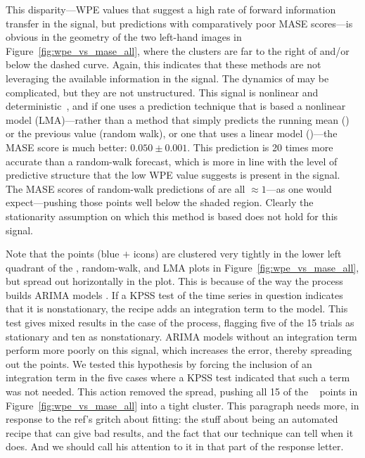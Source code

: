 This disparity---WPE values that suggest a high rate of forward
information transfer in the signal, but predictions with comparatively
poor MASE scores---is obvious in the geometry of the two left-hand
images in Figure~\ref{fig:wpe_vs_mase_all}, where the \col clusters
are far to the right of and/or below the dashed curve.  Again, this
indicates that these methods are not leveraging the available
information in the signal.  The dynamics of \col may be complicated,
but they are not unstructured.  This signal is nonlinear and
deterministic~\cite{mytkowicz09}, and if one uses a prediction
technique that is based a nonlinear model (LMA)---rather than a method
that simply predicts the running mean (\naive) or the previous value
(random walk), or one that uses a linear model (\arima)---the MASE
score is much better: $0.050 \pm 0.001$.  This prediction is 20 times
more accurate than a random-walk forecast, which is more in line with
the level of predictive structure that the low WPE value suggests is
present in the signal.  The MASE scores of random-walk predictions of
\col are all $\approx 1$---as one would expect---pushing those points
well below the shaded region.  Clearly the stationarity assumption on
which this method is based does not hold for this signal.

Note that the \col points (blue {\color{blue}$+$} icons) are clustered
very tightly in the lower left quadrant of the \naive, random-walk,
and LMA plots in Figure~\ref{fig:wpe_vs_mase_all}, but spread out
horizontally in the \arima plot.  This is because of the way the
\arima process builds ARIMA models \cite{autoARIMA}.  If a KPSS test
of the time series in question indicates that it is nonstationary, the
\arima recipe adds an integration term to the model.  This test gives
mixed results in the case of the \col process, flagging five of the 15
trials as stationary and ten as nonstationary.  ARIMA models without
an integration term perform more poorly on this signal, which
increases the error, thereby spreading out the points.  We tested this
hypothesis by forcing the inclusion of an integration term in the five
cases where a KPSS test indicated that such a term was not needed.
This action removed the spread, pushing all 15 of the \col ~ \arima
points in Figure~\ref{fig:wpe_vs_mase_all} into a tight cluster.
\alert{This paragraph needs more, in response to the ref's gritch
  about fitting: the stuff about \arima being an automated recipe that
  can give bad results, and the fact that our technique can tell when
  it does.  And we should call his attention to it in that part of the
  response letter.}

